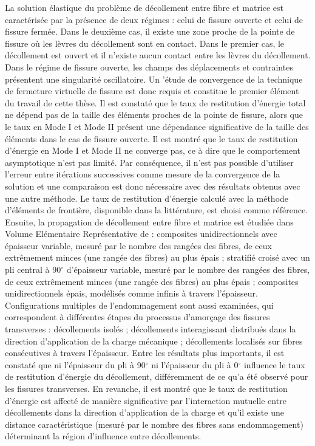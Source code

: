 La solution \'elastique du probl\`eme de d\'ecollement entre fibre et matrice est caract\'eris\'ee par la pr\'esence de deux r\'egimes : celui de fissure ouverte et celui de fissure ferm\'ee. Dans le deuxi\`eme cas, il existe une zone proche de la pointe de fissure o\`u les l\`evres du d\'ecollement sont en contact. Dans le premier cas, le d\'ecollement est ouvert et il n'existe aucun contact entre les l\`evres du d\'ecollement. Dans le r\'egime de fissure ouverte, les champs des d\'eplacements et contraintes pr\'esentent une singularit\'e oscillatoire. Un '\'etude de convergence de la technique de fermeture virtuelle de fissure est donc requis et constitue le premier \'el\'ement du travail de cette th\`ese. Il est constat\'e que le taux de restitution d'\'energie total ne d\'epend pas de la taille des \'el\'ements proches de la pointe de fissure, alors que le taux en Mode I et Mode II pr\'esent une d\'ependance significative de la taille des \'el\'ements dans le cas de fissure ouverte. Il est montr\'e que le taux de restitution d'\'energie en Mode I et Mode II ne converge pas, ce \`a dire que le comportement asymptotique n'est pas limit\'e. Par cons\'equence, il n'est pas possible d'utiliser l'erreur entre it\'erations successives comme mesure de la convergence de la solution et une comparaison est donc n\'ecessaire avec des r\'esultats obtenus avec une autre m\'ethode. Le taux de restitution d'\'energie calcul\'e avec la m\'ethode d'\'el\'ements de fronti\`ere, disponible dans la litt\'erature, est choisi comme r\'ef\'erence.
Ensuite, la propagation de d\'ecollement entre fibre et matrice est \'etudi\'ee dans Volume El\'ementaire Repr\'esentative de : composites unidirectionnels avec \'epaisseur variable, mesur\'e par le nombre des rang\'ees des fibres, de ceux extr\^emement minces (une rang\'ee des fibres) au plus \'epais ; stratifi\'e crois\'e avec un pli central \`a 90$^{\circ}$ d'\'epaisseur variable, mesur\'e par le nombre des rang\'ees des fibres, de ceux extr\^emement minces (une rang\'ee des fibres) au plus \'epais ; composites unidirectionnels \'epais, mod\'elis\'es comme infinis \`a travers l'\'epaisseur. Configurations multiples de l'endommagement sont aussi examin\'ees, qui correspondent \`a diff\'erentes \'etapes du processus d'amor\c{c}age des fissures transverses : d\'ecollements isol\'es ; d\'ecollements interagissant distribu\'es dans la direction d'application de la charge m\'ecanique ; d\'ecollements localis\'es sur fibres cons\'ecutives \`a travers l'\'epaisseur. Entre les r\'esultats plus importants, il est constat\'e que ni l'\'epaisseur du pli \`a 90$^{\circ}$ ni l'\'epaisseur du pli \`a 0$^{\circ}$ influence le taux de restitution d'\'energie du d\'ecollement, diff\'eremment de ce qu'a \'et\'e observ\'e pour les fissures transverses. En revanche, il est montr\'e que le taux de restitution d'\'energie est affect\'e de mani\`ere significative par l'interaction mutuelle entre d\'ecollements dans la direction d'application de la charge et qu'il existe une distance caract\'eristique (mesur\'e par le nombre des fibres sans endommagement) d\'eterminant la r\'egion d'influence entre d\'ecollements.\\
